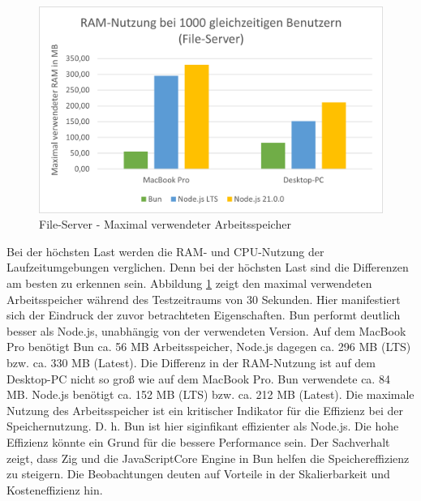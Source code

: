 \begin{figure}[h]
	\centering
	\includegraphics[width=\linewidth]{./images/fileServerRamUsage.png}
	\caption{File-Server - Maximal verwendeter Arbeitsspeicher}
	\label{fig:fileServerRamUsage}
\end{figure}


\noindent
Bei der höchsten Last werden die RAM- und CPU-Nutzung der Laufzeitumgebungen verglichen. Denn bei der höchsten Last sind die Differenzen am besten zu erkennen sein. Abbildung \ref{fig:fileServerRamUsage} zeigt den maximal verwendeten Arbeitsspeicher während des Testzeitraums von 30 Sekunden. Hier manifestiert sich der Eindruck der zuvor betrachteten Eigenschaften. Bun performt deutlich besser als Node.js, unabhängig von der verwendeten Version. Auf dem MacBook Pro benötigt Bun ca. 56 MB Arbeitsspeicher, Node.js dagegen ca. 296 MB (LTS) bzw. ca. 330 MB (Latest). Die Differenz in der RAM-Nutzung ist auf dem Desktop-PC nicht so groß wie auf dem MacBook Pro. Bun verwendete ca. 84 MB. Node.js benötigt ca. 152 MB (LTS) bzw. ca. 212 MB (Latest). Die maximale Nutzung des Arbeitsspeicher ist ein kritischer Indikator für die Effizienz bei der Speichernutzung. D. h. Bun ist hier siginfikant effizienter als Node.js. Die hohe Effizienz könnte ein Grund für die bessere Performance sein. Der Sachverhalt zeigt, dass Zig und die JavaScriptCore Engine in Bun helfen die Speichereffizienz zu steigern. Die Beobachtungen deuten auf Vorteile in der Skalierbarkeit und Kosteneffizienz hin.\\

